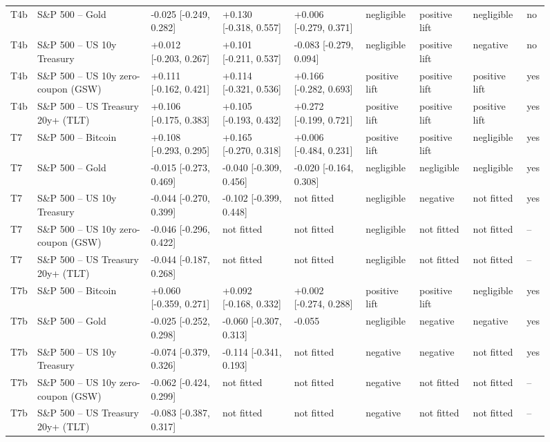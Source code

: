 \begin{figure}[t]
{\begin{tabular}{lllllllll}
T4b & S\&P 500 -- Gold & -0.025 [-0.249, 0.282] & +0.130 [-0.318, 0.557] & +0.006 [-0.279, 0.371] & negligible & positive lift & negligible & no \\
T4b & S\&P 500 -- US 10y Treasury & +0.012 [-0.203, 0.267] & +0.101 [-0.211, 0.537] & -0.083 [-0.279, 0.094] & negligible & positive lift & negative & no \\
T4b & S\&P 500 -- US 10y zero-coupon (GSW) & +0.111 [-0.162, 0.421] & +0.114 [-0.321, 0.536] & +0.166 [-0.282, 0.693] & positive lift & positive lift & positive lift & yes \\
T4b & S\&P 500 -- US Treasury 20y+ (TLT) & +0.106 [-0.175, 0.383] & +0.105 [-0.193, 0.432] & +0.272 [-0.199, 0.721] & positive lift & positive lift & positive lift & yes \\
T7 & S\&P 500 -- Bitcoin & +0.108 [-0.293, 0.295] & +0.165 [-0.270, 0.318] & +0.006 [-0.484, 0.231] & positive lift & positive lift & negligible & yes \\
T7 & S\&P 500 -- Gold & -0.015 [-0.273, 0.469] & -0.040 [-0.309, 0.456] & -0.020 [-0.164, 0.308] & negligible & negligible & negligible & yes \\
T7 & S\&P 500 -- US 10y Treasury & -0.044 [-0.270, 0.399] & -0.102 [-0.399, 0.448] & not fitted & negligible & negative & not fitted & yes \\
T7 & S\&P 500 -- US 10y zero-coupon (GSW) & -0.046 [-0.296, 0.422] & not fitted & not fitted & negligible & not fitted & not fitted & -- \\
T7 & S\&P 500 -- US Treasury 20y+ (TLT) & -0.044 [-0.187, 0.268] & not fitted & not fitted & negligible & not fitted & not fitted & -- \\
T7b & S\&P 500 -- Bitcoin & +0.060 [-0.359, 0.271] & +0.092 [-0.168, 0.332] & +0.002 [-0.274, 0.288] & positive lift & positive lift & negligible & yes \\
T7b & S\&P 500 -- Gold & -0.025 [-0.252, 0.298] & -0.060 [-0.307, 0.313] & -0.055 & negligible & negative & negative & yes \\
T7b & S\&P 500 -- US 10y Treasury & -0.074 [-0.379, 0.326] & -0.114 [-0.341, 0.193] & not fitted & negative & negative & not fitted & yes \\
T7b & S\&P 500 -- US 10y zero-coupon (GSW) & -0.062 [-0.424, 0.299] & not fitted & not fitted & negative & not fitted & not fitted & -- \\
T7b & S\&P 500 -- US Treasury 20y+ (TLT) & -0.083 [-0.387, 0.317] & not fitted & not fitted & negative & not fitted & not fitted & -- \\

\end{tabular}}
\end{figure}
